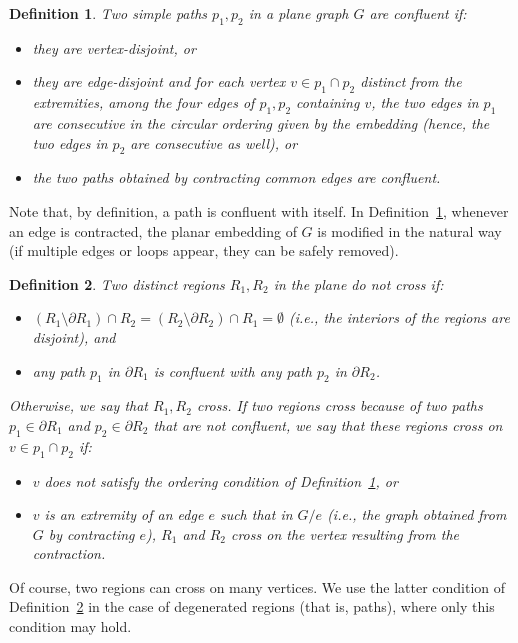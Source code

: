 \documentclass[a4paper,11pt]{article}
\newtheorem{defi} {Definition}
\begin{document}
\begin{defi}\label{def:confluent} Two simple paths $p_1,p_2$ in a plane graph $G$ are \emph{confluent} if:
\begin{itemize}\itemsep0em
\item they are vertex-disjoint, or
\item they are edge-disjoint and for each vertex $v \in p_1 \cap p_2$ distinct from the  extremities, among the four edges of $p_1,p_2$ containing $v$, the two edges in $p_1$ are consecutive in the circular ordering given by the embedding (hence, the two edges in $p_2$ are consecutive as well), or
\item the two paths obtained by contracting common edges are confluent.
\end{itemize}\end{defi}

Note that, by definition, a path is confluent with itself. In Definition~\ref{def:confluent}, whenever an edge is contracted, the planar embedding of $G$ is modified in the natural way (if multiple edges or loops appear, they can be safely removed).

\begin{defi}\label{def:cross} Two distinct regions $R_1, R_2$ in the plane \emph{do not cross} if:
\begin{itemize}\itemsep0em
\item  $(R_1 \setminus \partial R_1) \cap R_2 = (R_2 \setminus \partial R_2) \cap R_1 = \emptyset $ (i.e., the interiors of the regions are disjoint), and
\item any path $p_1$ in $\partial R_1$ is confluent with any path $p_2$ in $\partial R_2$.
\end{itemize}
\noindent Otherwise, we say that $R_1, R_2$ \emph{cross}. If two regions cross because of two paths $p_1 \in \partial R_1$ and $p_2 \in \partial R_2$ that are not confluent, we say that these regions \emph{cross on $v \in  p_1 \cap p_2$} if:
\begin{itemize}\itemsep0em
\item $v$ does not satisfy the ordering condition of Definition~\ref{def:confluent}, or
\item $v$ is an extremity of an edge $e$ such that in $G/e$ (i.e., the graph obtained from $G$ by contracting $e$), $R_1$ and $R_2$ cross on the vertex resulting from the contraction.
\end{itemize} \end{defi}

Of course, two regions can cross on many vertices. We use the latter condition of Definition~\ref{def:cross} in the case of degenerated regions (that is, paths), where only this condition may hold.
\end{document}
